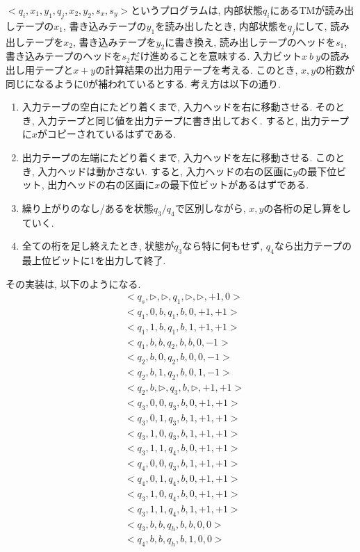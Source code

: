 \begin{ex}
    \label{ex3.4}
    $<q_i, x_1, y_1, q_j, x_2, y_2, s_x, s_y>$というプログラムは, 内部状態$q_i$にあるTMが読み出しテープの$x_1$, 書き込みテープの$y_1$を読み出したとき, 内部状態を$q_j$にして, 読み出しテープを$x_2$, 書き込みテープを$y_2$に書き換え, 読み出しテープのヘッドを$s_1$, 書き込みテープのヘッドを$s_2$だけ進めることを意味する.
    入力ビット$x\  b\  y$の読み出し用テープと$x+y$の計算結果の出力用テープを考える. このとき, $x,y$の桁数が同じになるように0が補われているとする.
    考え方は以下の通り.
    \begin{enumerate}
        \item 入力テープの空白にたどり着くまで, 入力ヘッドを右に移動させる.
              そのとき, 入力テープと同じ値を出力テープに書き出しておく.
              すると, 出力テープに$x$がコピーされているはずである.
        \item 出力テープの左端にたどり着くまで, 入力ヘッドを左に移動させる. このとき, 入力ヘッドは動かさない. すると, 入力ヘッドの右の区画に$y$の最下位ビット, 出力ヘッドの右の区画に$x$の最下位ビットがあるはずである.
        \item 繰り上がりのなし/あるを状態$q_3/q_4$で区別しながら, $x,y$の各桁の足し算をしていく.
        \item 全ての桁を足し終えたとき, 状態が$q_3$なら特に何もせず, $q_4$なら出力テープの最上位ビットに1を出力して終了.
    \end{enumerate}
    その実装は, 以下のようになる.
    \begin{align*}
         & <q_s, \rhd, \rhd, q_1, \rhd, \rhd, +1, 0> \\
         & <q_1, 0, b, q_1, b, 0,+1, +1>             \\
         & <q_1, 1, b, q_1, b, 1, +1, +1>            \\
         & <q_1, b, b, q_2, b, b, 0, -1>             \\
         & <q_2, b, 0, q_2, b, 0, 0, -1>             \\
         & <q_2, b, 1, q_2, b, 0, 1, -1>             \\
         & <q_2, b, \rhd, q_3, b, \rhd, +1, +1>      \\
         & <q_3, 0, 0, q_3, b, 0, +1, +1>            \\
         & <q_3, 0, 1, q_3, b, 1, +1, +1>            \\
         & <q_3, 1, 0, q_3, b, 1, +1, +1>            \\
         & <q_3, 1, 1, q_4, b, 0, +1, +1>            \\
         & <q_4, 0, 0, q_3, b, 1, +1, +1>            \\
         & <q_4, 0, 1, q_4, b, 0, +1, +1>            \\
         & <q_3, 1, 0, q_4, b, 0, +1, +1>            \\
         & <q_3, 1, 1, q_4, b, 1, +1, +1>            \\
         & <q_3, b, b, q_h, b, b, 0, 0>              \\
         & <q_4, b, b, q_h, b, 1, 0, 0>              \\
    \end{align*}
\end{ex}

